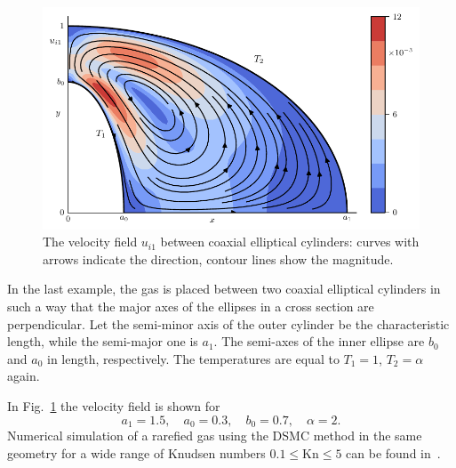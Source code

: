 \documentclass[smallextended, referee]{svjour3} %
\newcommand{\Kn}{\mathrm{Kn}}
\begin{document}
\begin{figure}
	\centering
	\includegraphics{Fig9}
	\caption{The velocity field \(u_{i1}\) between coaxial elliptical cylinders:
		curves with arrows indicate the direction, contour lines show the magnitude.}
	\label{fig:elliptic}
\end{figure}

In the last example, the gas is placed between two coaxial elliptical cylinders
in such a way that the major axes of the ellipses in a cross section are perpendicular.
Let the semi-minor axis of the outer cylinder be the characteristic length, while the semi-major one is \(a_1\).
The semi-axes of the inner ellipse are \(b_0\) and \(a_0\) in length, respectively.
The temperatures are equal to \(T_1 = 1\), \(T_2 = \alpha\) again.

In Fig.~\ref{fig:elliptic} the velocity field is shown for
\[ a_1 = 1.5, \quad a_0 = 0.3, \quad b_0 = 0.7, \quad \alpha = 2. \]
Numerical simulation of a rarefied gas using the DSMC method in the same geometry
for a wide range of Knudsen numbers \(0.1\le\Kn\le5\) can be found in~\cite{SoneCoaxial}.
\end{document}
